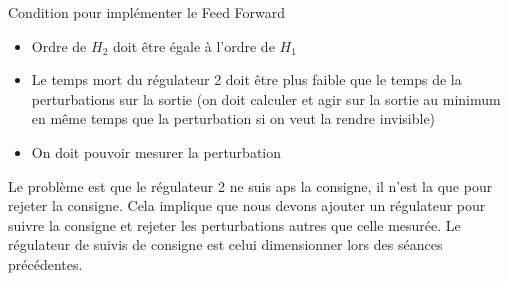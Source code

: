 Condition pour implémenter le Feed Forward
\begin{itemize}
\item Ordre de $H_{2}$ doit être égale à l'ordre de $H_{1}$
\item Le temps mort du régulateur 2 doit être plus faible que le temps de la perturbations sur la sortie (on doit calculer et agir sur la sortie au minimum en même temps que la perturbation si on veut la rendre invisible)
\item On doit pouvoir mesurer la perturbation
\end{itemize}

Le problème est que le régulateur 2 ne suis aps la consigne, il n'est la que pour rejeter la consigne. Cela implique que nous devons ajouter un régulateur pour suivre la consigne et rejeter les perturbations autres que celle mesurée. Le régulateur de suivis de consigne est celui dimensionner lors des séances précédentes. 